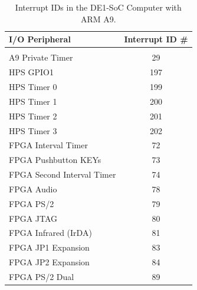 \documentclass[11pt, twoside, pdftex]{article}
\newcommand{\commonFiles}{../../../common/doc}
\newcommand{\systemNameFull}{DE1-SoC Computer with ARM A9}
\begin{document}









\begin{table}[h]
    \begin{center}
    \begin{tabular}{l|c}
          \textbf{I/O Peripheral} &
          \textbf{Interrupt ID \#}        \\
          \hline\vspace{-3mm}             \\
          A9 Private Timer & 29           \\
          HPS GPIO1 & 197                 \\
          HPS Timer 0 & 199               \\
          HPS Timer 1 & 200               \\
          HPS Timer 2 & 201               \\
          HPS Timer 3 & 202               \\
		  FPGA Interval Timer & 72        \\
		  FPGA Pushbutton KEYs & 73       \\
		  FPGA Second Interval Timer & 74 \\
		  FPGA Audio & 78                 \\
		  FPGA PS/2 & 79                  \\
		  FPGA JTAG & 80                  \\
		  FPGA Infrared (IrDA) & 81       \\
		  FPGA JP1 Expansion & 83         \\
		  FPGA JP2 Expansion & 84         \\
		  FPGA PS/2 Dual & 89             \\
    \end{tabular}
    \caption{Interrupt IDs in the \systemNameFull.}
	\label{tab:irq}
    \end{center}
\end{table}








\end{document}
